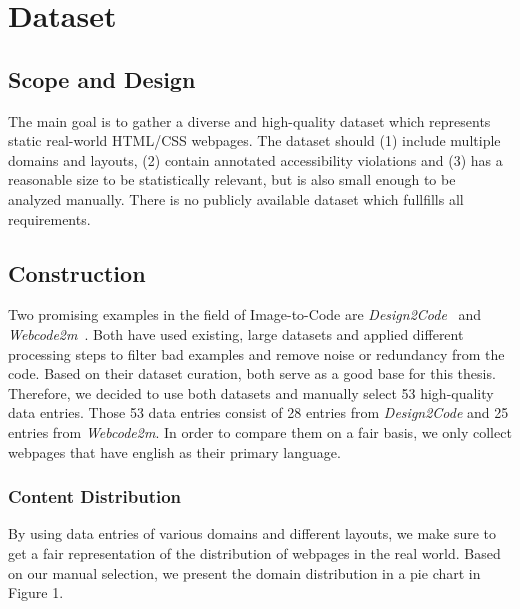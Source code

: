 \chapter{Dataset}\label{chapter:Dataset}

\section{Scope and Design}
The main goal is to gather a diverse and high-quality dataset which represents static
real-world HTML/CSS webpages. The dataset should (1) include multiple domains and layouts,
(2) contain annotated accessibility violations and (3) has a reasonable size to be
statistically relevant, but is also small enough to be analyzed manually.
There is no publicly available dataset which fullfills all requirements.

\section{Construction}
Two promising examples in the field of Image-to-Code are \textit{Design2Code}~\parencite{si2024design2code} 
and \textit{Webcode2m}~\parencite{gui2024webcode2m}. 
Both have used existing, large datasets and applied different processing steps to 
filter bad examples and remove noise or redundancy from the code. Based on their
dataset curation, both serve as a good base for this thesis.\newline
Therefore, we decided to use both datasets and manually select 53 high-quality data 
entries. Those 53 data entries consist of 28 entries from \textit{Design2Code} and 25 entries
from \textit{Webcode2m}. In order to compare them on a fair basis, we only collect webpages 
that have english as their primary language.

\subsection{Content Distribution}
By using data entries of various domains and different layouts, we make sure to get 
a fair representation of the distribution of webpages in the real world. Based on 
our manual selection, we present the domain distribution in a pie chart in Figure 1.

